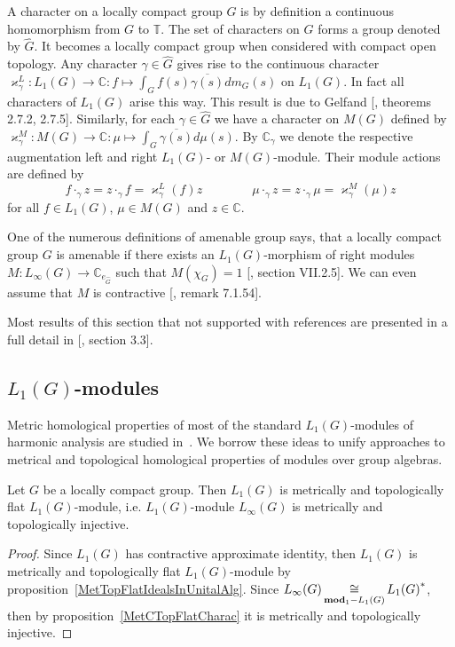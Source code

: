 A character on a locally compact group $G$ is by definition a continuous 
homomorphism from $G$ to $\mathbb{T}$. The set of characters on $G$ forms a 
group denoted by $\widehat{G}$. It becomes a locally compact group when 
considered with compact open topology. Any character $\gamma\in\widehat{G}$ 
gives rise to the continuous character 
$\varkappa_\gamma^L
:L_1(G)\to\mathbb{C}
:f\mapsto \int_G f(s)\overline{\gamma(s)}dm_G(s)$ on $L_1(G)$. In fact all 
characters of $L_1(G)$ arise this way. This result is due to 
Gelfand [\cite{KaniBanAlg}, theorems 2.7.2, 2.7.5]. Similarly, for 
each $\gamma\in\widehat{G}$ we have a character on $M(G)$ defined by 
$\varkappa_\gamma^M
:M(G)\to\mathbb{C}
:\mu\mapsto\int_{G} \overline{\gamma(s)}d\mu(s)$. By $\mathbb{C}_\gamma$ we 
denote the respective augmentation left and right $L_1(G)$- or $M(G)$-module. 
Their module actions are defined by
$$
f\cdot_{\gamma}z=z\cdot_{\gamma}f=\varkappa_\gamma^L(f)z \qquad\qquad
\mu\cdot_{\gamma}z=z\cdot_{\gamma}\mu=\varkappa_\gamma^M(\mu)z
$$
for all $f\in L_1(G)$, $\mu\in M(G)$ and $z\in\mathbb{C}$. 

One of the numerous definitions of amenable group says, that a locally compact 
group $G$ is amenable if there exists an $L_1(G)$-morphism of right 
modules $M:L_\infty(G)\to\mathbb{C}_{e_{\widehat{G}}}$ such 
that $M(\chi_G)=1$ [\cite{HelBanLocConvAlg}, section VII.2.5]. We can even 
assume that $M$ is contractive [\cite{HelBanLocConvAlg}, remark 7.1.54].

Most results of this section that not supported with references are 
presented in a full detail in [\cite{DalBanAlgAutCont}, section 3.3].


\subsection{
    \texorpdfstring{$L_1(G)$}{L1(G)}-modules}\label{
SubSectionL1GModules}

Metric homological properties of most of the standard $L_1(G)$-modules of 
harmonic analysis are studied in~\cite{GravInjProjBanMod}. We borrow these 
ideas to unify approaches to metrical and topological homological properties 
of modules over group algebras.

\begin{proposition}\label{LInfIsL1MetrInj} Let $G$ be a locally compact group. 
Then $L_1(G)$ is metrically and topologically flat $L_1(G)$-module, 
i.e. $L_1(G)$-module $L_\infty(G)$ is metrically and topologically injective.
\end{proposition} 
\begin{proof} Since $L_1(G)$ has contractive approximate identity, 
then $L_1(G)$ is metrically and topologically flat $L_1(G)$-module 
by proposition~\ref{MetTopFlatIdealsInUnitalAlg}. 
Since $L_\infty(G)\mathop{\mathbin{\cong}}\limits_{\mathbf{mod}_1-L_1(G)}{L_1(G)}^*$, then by 
proposition~\ref{MetCTopFlatCharac} it is metrically and topologically injective.
\end{proof}

